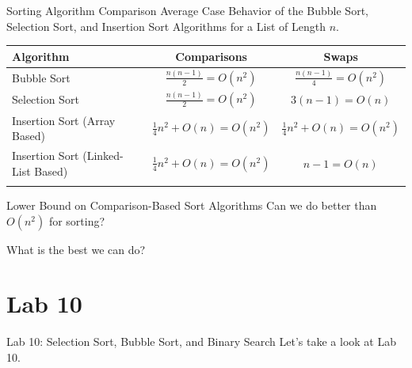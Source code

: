 \documentclass[14pt,aspectratio=1610]{beamer}
\begin{document}
\begin{frame}{Sorting Algorithm Comparison}
\center{}
{\small Average Case Behavior of the Bubble Sort, Selection Sort, and Insertion Sort Algorithms for a List of Length \(n\).}

{\small%
\begin{tabularx}{\textwidth}{Xcc}
\toprule{}
  \textbf{Algorithm} & \textbf{Comparisons} & \textbf{Swaps}\\
\midrule{}
Bubble Sort & \(\frac{n(n-1)}{2} = O(n^2)\) & \(\frac{n(n-1)}{4} = O(n^2)\) \\[1.3ex]
Selection Sort & \(\frac{n(n-1)}{2} = O(n^2)\) & \(3(n - 1) = O(n)\) \\[1.3ex]
Insertion Sort (Array Based) & \(\frac{1}{4}n^2 + O(n) = O(n^2)\) & \(\frac{1}{4}n^2 + O(n) = O(n^2)\) \\[1.3ex]
Insertion Sort (Linked-List Based) & \(\frac{1}{4}n^2 + O(n) = O(n^2)\) & \(n - 1 = O(n)\) \\
\bottomrule{}
\end{tabularx}%
}
\end{frame}

\begin{frame}{\large{Lower Bound on Comparison-Based Sort Algorithms}}
\center\Large
Can we do better than \(O(n^2)\) for sorting?\vspace{1em}

What is the best we can do?
\end{frame}

\section*{Lab 10}
\begin{frame}{\large{Lab 10: Selection Sort, Bubble Sort, and Binary Search}}
\centering\Large
  Let's take a look at Lab 10.
\end{frame}
\end{document}
